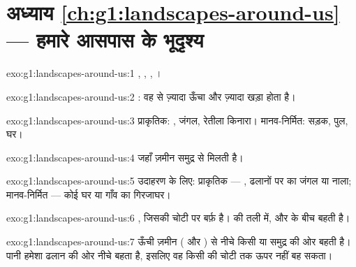 \section*{अध्याय \ref{ch:g1:landscapes-around-us} --- हमारे आसपास के भूदृश्य}

\begin{solution}{exo:g1:landscapes-around-us:1}
, , , ।
\end{solution}

\begin{solution}{exo:g1:landscapes-around-us:2}
: वह  से ज़्यादा ऊँचा और ज़्यादा खड़ा होता है।
\end{solution}

\begin{solution}{exo:g1:landscapes-around-us:3}
प्राकृतिक: , जंगल, रेतीला किनारा। मानव-निर्मित: सड़क, पुल,
घर।
\end{solution}

\begin{solution}{exo:g1:landscapes-around-us:4}
जहाँ ज़मीन समुद्र से मिलती है।
\end{solution}

\begin{solution}{exo:g1:landscapes-around-us:5}
उदाहरण के लिए: प्राकृतिक --- , ढलानों पर का जंगल या नाला;
मानव-निर्मित --- कोई घर या गाँव का गिरजाघर।
\end{solution}

\begin{solution}{exo:g1:landscapes-around-us:6}
, जिसकी चोटी पर बर्फ़ है।   की तली में,  और 
के बीच बहती है।
\end{solution}

\begin{solution}{exo:g1:landscapes-around-us:7}
 ऊँची ज़मीन ( और ) से नीचे किसी  या समुद्र की ओर
बहती है। पानी हमेशा ढलान की ओर नीचे बहता है, इसलिए वह किसी  की
चोटी तक ऊपर नहीं बह सकता।
\end{solution}

